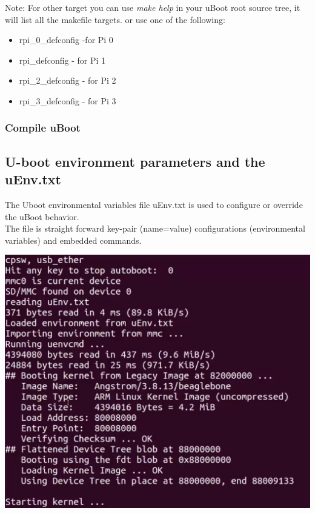 \documentclass{article}
\begin{document}
Note: For other target you can use \textit{make help} in your uBoot root source tree, it will list all the makefile targets. or use one of the following:
\begin{itemize}
    \item rpi\_0\_defconfig -for Pi 0
    \item rpi\_defconfig - for Pi 1
    \item rpi\_2\_defconfig - for Pi 2
    \item rpi\_3\_defconfig - for Pi 3
\end{itemize}

\subsubsection{Compile uBoot}




\subsection{U-boot environment parameters and the uEnv.txt}
The Uboot environmental variables file uEnv.txt is used to configure or override the uBoot behavior.\\
The file is straight forward key-pair (name=value) configurations (environmental variables) and embedded commands.  



\begin{center}
\includegraphics[scale=0.50]{./resources/img/uboot-logs01.png}
\end{center}
\end{document}
